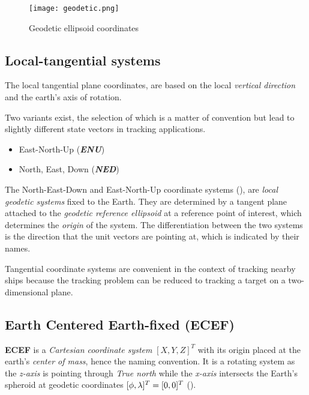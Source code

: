 \begin{figure}[H]
	\centering
	\texttt{[image: geodetic.png]}
	\caption{Geodetic ellipsoid coordinates}
	\label{fig:geodetic_coords}
\end{figure}

\subsection{Local-tangential systems}

The local tangential plane coordinates, are based on the local \emph{vertical direction} and the earth's axis of rotation.

Two variants exist, the selection of which is a matter of convention but lead to slightly different state vectors in tracking applications.



\begin{itemize}
	\item East-North-Up (\textbf{\emph{ENU}})
	\item North, East, Down (\textbf{\emph{NED}})
\end{itemize}

The North-East-Down and East-North-Up coordinate systems (), are \emph{local geodetic systems} fixed to the Earth. They are determined by a tangent plane attached to the \emph{geodetic reference ellipsoid} at a reference point of interest, which determines the \emph{origin} of the system. The differentiation between the two systems is the direction that the unit vectors are pointing at, which is indicated by their names.


Tangential coordinate systems are convenient in the context of tracking nearby ships because the tracking problem can be reduced to tracking a target on a two-dimensional plane.


\subsection{Earth Centered Earth-fixed (ECEF)}

\textbf{ECEF} is a \emph{Cartesian coordinate system} $[X,Y,Z]^T$ with its origin placed at the earth's \emph{center of mass}, hence the naming convention. It is a rotating system as the \emph{z-axis} is pointing through \emph{True north} while the \emph{x-axis} intersects the Earth's spheroid at geodetic coordinates $[\phi,{\lambda}]^{T} =  [0,0]^{T}$ ().


